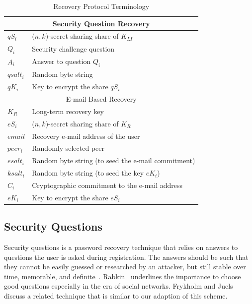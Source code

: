 \begin{table}[htb]
\centering
\caption{Recovery Protocol Terminology}
    \begin{tabular}{lp{65mm}}
		\toprule
		\multicolumn{2}{c}{Security Question Recovery}\\
		\midrule
		$qS_i $ & ($n,k$)-secret sharing share of $K_{LI}$\\
		$Q_i $ & Security challenge question\\
		$A_i $ & Answer to question $Q_i$\\
		$qsalt_i $ & Random byte string \\
		$qK_i $ & Key to encrypt the share $qS_i$\\
		\midrule
		\multicolumn{2}{c}{E-mail Based Recovery}\\
		\midrule
		$K_R $ & Long-term recovery key\\
		$eS_i $ & ($n,k$)-secret sharing share of $K_R$\\
		$email $ & Recovery e-mail address of the user\\
		$peer_i $ & Randomly selected peer\\
		$esalt_i $ & Random byte string (to seed the e-mail commitment)\\
		$ksalt_i $ & Random byte string (to seed the key $eK_i$)\\
		$C_i $ & Cryptographic commitment to the e-mail address\\
		$eK_i $ & Key to encrypt the share $eS_i$\\
		\bottomrule
    \end{tabular}
\end{table}

\subsection{Security Questions}

Security questions is a password recovery technique
that relies on answers to questions the user is asked during registration.
The answers should be such that they cannot be easily guessed or researched by an attacker, but
still stable over time, memorable, and definite~\cite{GoodSecurityQuestions}.
Rabkin~\cite{Rabkin08} underlines the importance to choose good questions especially in the era of social networks.
Frykholm and Juels~\cite{FrykholmJ01} discuss a related technique that is similar to 
our adaption of this scheme.  

